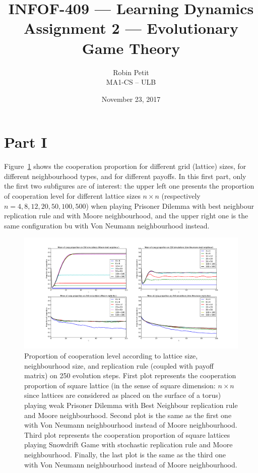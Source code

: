 \documentclass{article}
\title{INFOF-409 --- Learning Dynamics\\ Assignment 2 --- Evolutionary Game Theory}
\author{Robin Petit\\ MA1-CS -- ULB}
\date{November 23, 2017}
\begin{document}
\maketitle
\tableofcontents
\newpage
{}
\setcounter{page}{1}

\section{Part I}

Figure~\ref{fig:coop proportion} shows the cooperation proportion for different grid (lattice) sizes,
for different neighbourhood types, and for different payoffs. In this first part, only the first two
subfigures are of interest: the upper left one presents the proportion of cooperation level for
different lattice sizes $n \times n$ (respectively $n=4,8,12,20,50,100,500$) when playing Prisoner
Dilemma with best neighbour replication rule and with Moore neighbourhood, and the upper right one
is the same configuration bu with Von Neumann neighbourhood instead.

\begin{figure}[!b]
\hspace{-2.5cm}
\vspace{-.7cm}
\includegraphics[width=1.3\textwidth]{imgs/means-250.png}
\caption{Proportion of cooperation level according to lattice size, neighbourhood size, and replication
rule (coupled with payoff matrix) on 250 evolution steps. First plot represents the cooperation
proportion of square lattice (in the sense of square dimension: $n \times n$ since lattices are
considered as placed on the surface of a torus) playing weak Prisoner Dilemma with Best Neighbour
replication rule and Moore neighbourhood. Second plot is the same as the first one with Von Neumann
neighbourhood instead of Moore neighbourhood. Third plot represents the cooperation proportion of
square lattices playing Snowdrift Game with stochastic replication rule and Moore neighbourhood.
Finally, the last plot is the same as the third one with Von Neumann neighbourhood instead of Moore
neighbourhood.
\label{fig:coop proportion}}
\end{figure}
\end{document}
